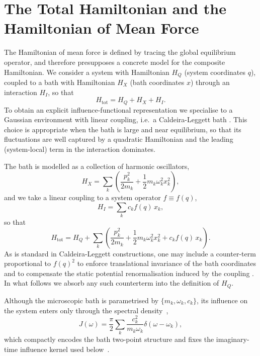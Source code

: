\section{\label{sec:model}The Total Hamiltonian and the Hamiltonian of Mean Force}
The Hamiltonian of mean force is defined by tracing the global equilibrium
operator, and therefore presupposes a concrete model for the composite
Hamiltonian. We consider a system with Hamiltonian $H_Q$ (system coordinates
$q$), coupled to a bath with Hamiltonian $H_X$ (bath coordinates $x$) through an
interaction $H_I$, so that
\begin{equation}
    H_{\mathrm{tot}}=H_Q+H_X+H_I.
    \label{eq:Htot_model}
\end{equation}
To obtain an explicit influence-functional representation we specialise to a
Gaussian environment with linear coupling, i.e.\ a Caldeira-Leggett bath \cite{caldeiraQuantumTunnellingDissipative1983a}. This
choice is appropriate when the bath is large and near equilibrium, so that its
fluctuations are well captured by a quadratic Hamiltonian and the leading
(system-local) term in the interaction dominates.

The bath is modelled as a collection of harmonic oscillators,
\begin{equation}
    H_X=\sum_k\left(\frac{p_k^2}{2m_k}+\frac{1}{2}m_k\omega_k^2 x_k^2\right),
    \label{eq:HX_model}
\end{equation}
and we take a linear coupling to a system operator $f\equiv f(q)$,
\begin{equation}
    H_I=\sum_k c_k f(q)\, x_k,
    \label{eq:HI_model}
\end{equation}
so that
\begin{equation}
    H_{\mathrm{tot}} = H_Q + \sum_k \left( \frac{p_k^2}{2m_k} + \frac{1}{2}m_k\omega_k^2 x_k^2 + c_k f(q)\, x_k \right).
    \label{eq:Htot_full}
\end{equation}
As is standard in Caldeira-Leggett constructions, one may include a counter-term
proportional to $f(q)^2$ to enforce translational invariance of the bath
coordinates and to compensate the static potential renormalisation induced by
the coupling \cite{caldeiraQuantumTunnellingDissipative1983a}. In what follows we absorb any such counterterm into the
definition of $H_Q$.

Although the microscopic bath is parametrised by $\{m_k,\omega_k,c_k\}$, its
influence on the system enters only through the spectral density~\cite{weissQuantumDissipativeSystems2012, breuerTheoryOpenQuantum2002},
\begin{equation}
    J(\omega) = \frac{\pi}{2} \sum_k \frac{c_k^2}{m_k \omega_k} \delta(\omega-\omega_k),
    \label{eq:spectral_density}
\end{equation}
which compactly encodes the bath two-point structure and fixes the imaginary-time influence kernel used below~\cite{feynmanTheoryGeneralQuantum1963a}.

